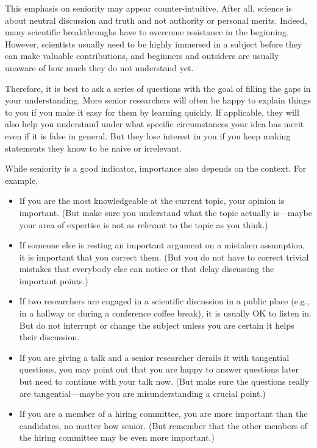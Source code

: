 \documentclass[12pt]{article}
\begin{document}
This emphasis on seniority may appear counter-intuitive.
After all, science is about neutral discussion and truth and not authority or personal merits.
Indeed, many scientific breakthroughs have to overcome resistance in the beginning.
However, scientists usually need to be highly immersed in a subject before they can make valuable contributions, and beginners and outsiders are usually unaware of how much they do not understand yet.

Therefore, it is best to ask a series of questions with the goal of filling the gaps in your understanding.
More senior researchers will often be happy to explain things to you if you make it easy for them by learning quickly.
If applicable, they will also help you understand under what specific circumstances your idea has merit even if it is false in general.
But they lose interest in you if you keep making statements they know to be naive or irrelevant.
\medskip

While seniority is a good indicator, importance also depends on the context.
For example,
\begin{itemize}
\item If you are the most knowledgeable at the current topic, your opinion is important.
(But make sure you understand what the topic actually is---maybe your area of expertise is not as relevant to the topic as you think.)
\item If someone else is resting an important argument on a mistaken assumption, it is important that you correct them.
(But you do not have to correct trivial mistakes that everybody else can notice or that delay discussing the important points.)
\item If two researchers are engaged in a scientific discussion in a public place (e.g., in a hallway or during a conference coffee break), it is usually OK to listen in.
But do not interrupt or change the subject unless you are certain it helps their discussion.
\item If you are giving a talk and a senior researcher derails it with tangential questions, you may point out that you are happy to answer questions later but need to continue with your talk now.
(But make sure the questions really are tangential---maybe you are misunderstanding a crucial point.)
\item If you are a member of a hiring committee, you are more important than the candidates, no matter how senior.
(But remember that the other members of the hiring committee may be even more important.)
\end{itemize}
\end{document}
